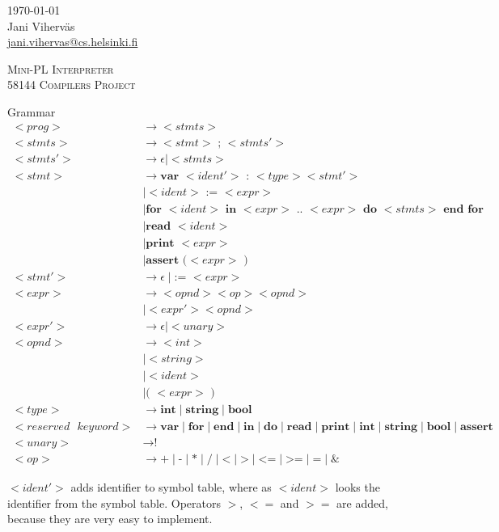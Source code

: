 \documentclass[a4paper,12pt]{article}
\author{Jani Viherväs}
\newcommand{\bb}[1]{\textbf{#1}}
\newcommand{\ttt}[1]{\texttt{#1}}
\newcommand{\e}{\epsilon}
\begin{document}
\begin{flushright}
\today \\
\vspace{1em}
Jani Viherväs\\ 
\href{mailto:jani.vihervas@cs.helsinki.fi}{jani.vihervas@cs.helsinki.fi}
\end{flushright}

\vfill

\begin{center}
\textsc{\LARGE Mini-PL Interpreter} \\
\vspace{1em}
\textsc{\large 58144 Compilers Project}
\end{center}

\vfill

Grammar
\begin{align*}
<prog> &\to <stmts> \\
<stmts> &\to <stmt> \bb{ ; } <stmts'> \\
<stmts'> &\to \e \mid <stmts> \\
<stmt> &\to \bb{var } <ident'> \bb{ : } <type> <stmt'> \\ 
       &\mid <ident> \bb{ := } <expr> \\  
       &\mid \bb{for } <ident> \bb{ in } <expr> \bb{ .. } <expr> \bb{ do } 
             <stmts> \bb{ end } \bb{for} \\
       &\mid \bb{read } <ident> \\
       &\mid \bb{print } <expr> \\
       &\mid \bb{assert (}  <expr> \bb{ )} \\
<stmt'> &\to \e \mid \bb{:= } <expr> \\
<expr> &\to <opnd> <op> <opnd> \\
       &\mid <expr'> <opnd> \\
<expr'> &\to \e \mid <unary> \\
<opnd> &\to <int> \\
       &\mid <string> \\
       &\mid <ident> \\
       &\mid \bb{( } <expr> \bb{ )} \\
<type> &\to \bb{int} \mid \bb{string} \mid \bb{bool} \\
<reserved\ttt{ } keyword> &\to 
              \bb{var} \mid \bb{for} \mid \bb{end} \mid \bb{in} \mid \bb{do} \mid \bb{read} \mid 
              \bb{print} \mid \bb{int} \mid \bb{string} \mid \bb{bool} \mid
              \bb{assert} \\
<unary> &\to \bb{!} \\
<op> &\to \bb{+} \mid \bb{-} \mid \bb{*} \mid \bb{/} \mid \bb{<} \mid
\bb{>} \mid \bb{<=} \mid \bb{>=} \mid \bb{=} \mid \bb{\&}
\end{align*}

$<ident'>$ adds identifier to symbol table, where as $<ident>$ looks the
identifier from the symbol table. Operators $>$, $<=$ and $>=$ are added,
because they are very easy to implement.
\end{document}
